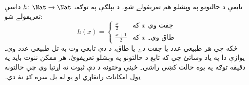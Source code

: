 \documentclass[../../../include/open-logic-section]{subfiles}
\begin{document}
\begin{ex}
تابعې د حالتونو په وېشلو هم تعريفولے شو۔ د بېلګې په توګه،
$h \colon \Nat \to \Nat$ داسې تعريفولے شو:
\[
h(x) =
\begin{cases}
  \frac{x}{2} & \text{که $x$ جفت وي} \\
  \frac{x+1}{2} & \text{که $x$ طاق وي۔}
\end{cases}
\]
ځکه چې هر طبيعي عدد يا جفت دے يا طاق، د دې تابعې وت به تل
طبيعي عدد وي۔ يوازې دا په ياد وساتئ چې که تابع د حالتونو په
وېشلو تعريفوئ، هر ممکن ننوت بايد په دقيقه توګه په يوه حالت کښې
راشي۔ ځينې وختونه د دې ثبوت ته اړتيا وي چې حالتونه ټول امکانات
رانغاړي او يو له بل سره ګډ نۀ دي۔
\end{ex}
\end{document}
